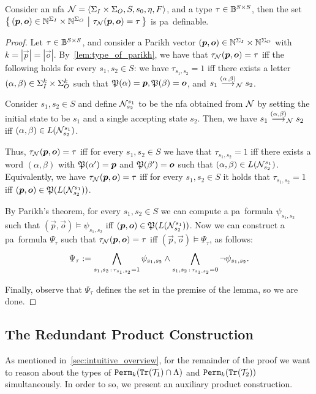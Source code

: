 \begin{lemma}
	\label{lem:parikh_type_definable}
	Consider an \gls{nfa} $\mathcal{N}=\left< \Sigma_{I}\times \Sigma_{O},S,s_0,\eta,F\right>$, and a type $\tau\in \mathbb{B}^{S\times S}$, then the set $\left\{\,(\boldsymbol{p},\boldsymbol{o})\in \mathbb{N}^{\Sigma_{I}} \times \mathbb{N}^{\Sigma_{O}}\ \middle|\ \tau_{\mathcal{N}}(\boldsymbol{p},\boldsymbol{o})=\tau\,\right\}$ is \gls{pa}~definable.
\end{lemma}
\begin{proof}
	Let $\tau\in \mathbb{B}^{S\times S}$, and consider a Parikh vector $(\boldsymbol{p},\boldsymbol{o})\in \mathbb{N}^{\Sigma_{I}} \times \mathbb{N}^{\Sigma_{O}}$ with $k=|\vec{p}|=|\vec{o}|$. By~\cref{lem:type_of_parikh}, we have that $\tau_{\mathcal{N}}(\boldsymbol{p},\boldsymbol{o})=\tau$ iff the following holds for every $s_1,s_2\in S$: we have $\tau_{s_1,s_2}=1$ iff 
	there exists a letter $(\alpha,\beta)\in \Sigma_{I}^k\times \Sigma_{O}^k$ such that $\mathfrak{P}(\alpha)=\boldsymbol{p},\mathfrak{P}(\beta)=\boldsymbol{o}$, and $s_1\stackrel{(\alpha,\beta)}{\longrightarrow}_{\mathcal{N}} s_2$.

	Consider $s_1,s_2\in S$ and define $\mathcal{N}^{s_1}_{s_2}$ to be the \gls{nfa} obtained from $\mathcal{N}$ by setting the initial state to be $s_1$ and a single accepting state $s_2$.
	Then, we have $s_1\stackrel{(\alpha,\beta)}{\longrightarrow}_{\mathcal{N}} s_2$ iff $(\alpha,\beta)\in L(\mathcal{N}^{s_1}_{s_2})$. 
	
	Thus, $\tau_{\mathcal{N}}(\boldsymbol{p},\boldsymbol{o})=\tau$ iff for every $s_1,s_2\in S$ we have that $\tau_{s_1,s_2}=1$ iff there exists a word $(\alpha,\beta)$ with $\mathfrak{P}(\alpha')=\boldsymbol{p}$ and $\mathfrak{P}(\beta')=\boldsymbol{o}$ such that $(\alpha,\beta)\in L(\mathcal{N}^{s_1}_{s_2})$.
	Equivalently, we have $\tau_{\mathcal{N}}(\boldsymbol{p},\boldsymbol{o})=\tau$ iff for every $s_1,s_2\in S$ it holds that $\tau_{s_1,s_2}=1$ iff $(\boldsymbol{p},\boldsymbol{o})\in \mathfrak{P}(L(\mathcal{N}^{s_1}_{s_2}))$.
	
	By Parikh's theorem, for every $s_1,s_2\in S$ we can compute a \gls{pa}~formula $\psi_{s_1,s_2}$ such that $(\vec{p},\vec{o})\models \psi_{s_1,s_2}$ iff $(\boldsymbol{p},\boldsymbol{o})\in \mathfrak{P}(L(\mathcal{N}^{s_1}_{s_2}))$. Now we can construct a \gls{pa}~formula $\Psi_{\tau}$ such that $\tau_{\mathcal{N}}(\boldsymbol{p},\boldsymbol{o})=\tau$ iff $(\vec{p},\vec{o})\models \Psi_\tau$, as follows:
	\[\Psi_\tau:= \bigwedge_{s_1,s_2\, :\, \tau_{s_1,s_2}=1} \psi_{s_1,s_2}\wedge \bigwedge_{s_1,s_2\, :\, \tau_{s_1,s_2}=0}\neg \psi_{s_1,s_2}.\]
	
	Finally, observe that $\Psi_\tau$ defines the set in the premise of the lemma, so we are done.
\end{proof}

\subsection*{The Redundant Product Construction}
As mentioned in~\cref{sec:intuitive_overview}, for the remainder of the proof we want to reason about the types of ${\mathtt{Perm}}_k({\mathtt{Tr}}(\mathcal{T}_1)\cap \Lambda)$ and ${\mathtt{Perm}}_k({\mathtt{Tr}}(\mathcal{T}_2))$ simultaneously. In order to so, we present an auxiliary product construction.

